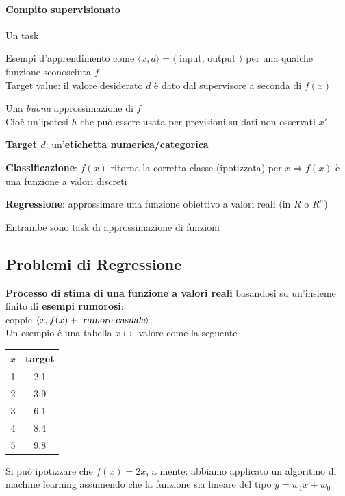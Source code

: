 \documentclass[10pt]{book}
\begin{document}
\paragraph{Compito supervisionato} Un task\\ \begin{list}{}{\textbf{Dati}}
	\item Esempi d'apprendimento come $\langle x, d\rangle = \langle$ input, output $\rangle$ per una qualche funzione sconosciuta $f$\\
	Target value: il valore desiderato $d$ è dato dal supervisore a seconda di $f(x)$
\end{list}
\begin{list}{}{\textbf{Trovare}}
	\item Una \textit{buona} approssimazione di $f$\\
	Cioè un'ipotesi $h$ che può essere usata per previsioni su dati non osservati $x'$
\end{list}\textbf{Target $d$}: un'\textbf{etichetta numerica/categorica}
\begin{list}{}{}
	\item \textbf{Classificazione}: $f(x)$ ritorna la corretta classe (ipotizzata) per $x \Rightarrow f(x)$ è una funzione a valori discreti
	\item \textbf{Regressione}: approssimare una funzione obiettivo a valori reali (in $R$ o $R^n$)
	\item Entrambe sono task di approssimazione di funzioni
\end{list}
\subsection{Problemi di Regressione}
\textbf{Processo di stima di una funzione a valori reali} basandosi su un'insieme finito di \textbf{esempi rumorosi}:\\coppie $\langle x, f(x) + \textsl{ rumore casuale}\rangle$.\\Un esempio è una tabella $x \mapsto$ valore come la seguente
\begin{multicols}{2}
\begin{center}
\begin{tabular}{c | c}
	$x$ & target\\
	\hline
	1 & 2.1\\
	2 & 3.9\\
	3 & 6.1\\
	4 & 8.4\\
	5 & 9.8
\end{tabular}
\end{center}
Si può ipotizzare che $f(x) = 2x$, a mente: abbiamo applicato un algoritmo di machine learning assumendo che la funzione sia lineare del tipo $y = w_1x + w_0$
\end{multicols}
\end{document}
